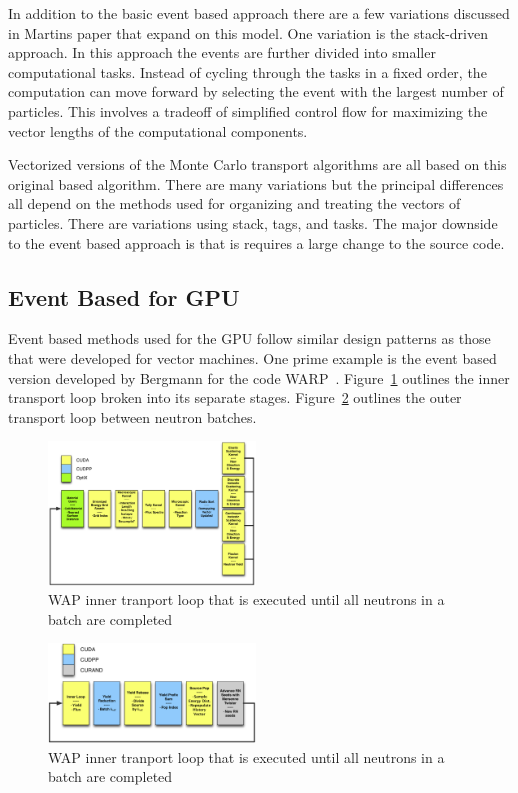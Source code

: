 In addition to the basic event based approach there are a few variations discussed in Martins paper that expand on this model.
%
One variation is the stack-driven approach.
%
In this approach the events are further divided into smaller computational tasks.
%
Instead of cycling through the tasks in a fixed order, the computation can move forward by selecting the event with the largest number of particles.
%
This involves a tradeoff of simplified control flow for maximizing the vector lengths of the computational components.
%

%
Vectorized versions of the Monte Carlo transport algorithms are all based on this original based algorithm.
%
There are many variations but the principal differences all depend on the methods used for organizing and treating the vectors of particles.
%
There are variations using stack, tags, and tasks.
%
The major downside to the event based approach is that is requires a large change to the source code.
%

\subsection*{Event Based for GPU}

%
Event based methods used for the GPU follow similar design patterns as those that were developed for vector machines.
%
One prime example is the event based version developed by Bergmann for the code WARP~\cite{2014development}.
%
Figure~\ref{fig:innerLoopWARP} outlines the inner transport loop broken into its separate stages.
%
Figure~\ref{fig:outerLoopWARP} outlines the outer transport loop between neutron batches.
%

\begin{figure}
\label{fig:innerLoopWARP}
\includegraphics[width=0.49\textwidth]{InnerLoopWARP}
\caption{WAP inner tranport loop that is executed until all neutrons in a batch are completed~\cite{2014development}}
\end{figure}

\begin{figure}
\label{fig:outerLoopWARP}
\includegraphics[width=0.49\textwidth]{OuterLoopWARP}
\caption{WAP inner tranport loop that is executed until all neutrons in a batch are completed~\cite{2014development}}
\end{figure}

